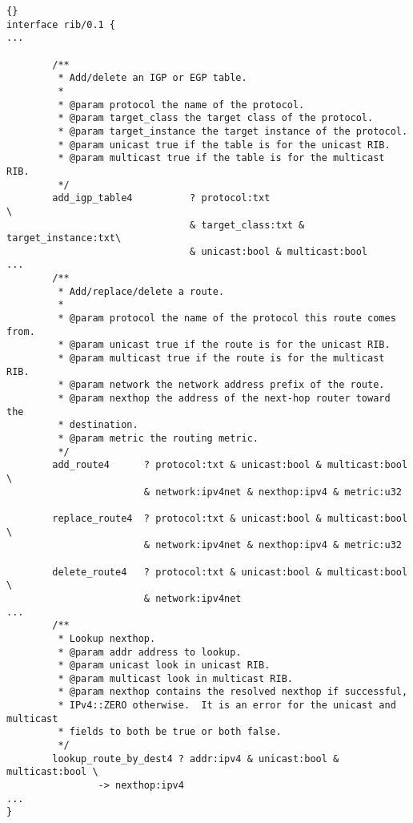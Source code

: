 \documentclass[11pt]{article}
\newcommand{\stt}{\tt\small}
\begin{document}
\newpage
\begin{lstlisting}[caption={Extracts from {\stt xorp/xrl/interfaces/rib.xif} %
                                     \label{lst:rib.xif} } ]{}
interface rib/0.1 {
...

        /**
         * Add/delete an IGP or EGP table.
         *
         * @param protocol the name of the protocol.
         * @param target_class the target class of the protocol.
         * @param target_instance the target instance of the protocol.
         * @param unicast true if the table is for the unicast RIB.
         * @param multicast true if the table is for the multicast RIB.
         */
        add_igp_table4          ? protocol:txt                          \
                                & target_class:txt & target_instance:txt\
                                & unicast:bool & multicast:bool
...
        /**
         * Add/replace/delete a route.
         *
         * @param protocol the name of the protocol this route comes from.
         * @param unicast true if the route is for the unicast RIB.
         * @param multicast true if the route is for the multicast RIB.
         * @param network the network address prefix of the route.
         * @param nexthop the address of the next-hop router toward the
         * destination.
         * @param metric the routing metric.
         */
        add_route4      ? protocol:txt & unicast:bool & multicast:bool  \
                        & network:ipv4net & nexthop:ipv4 & metric:u32

        replace_route4  ? protocol:txt & unicast:bool & multicast:bool  \
                        & network:ipv4net & nexthop:ipv4 & metric:u32

        delete_route4   ? protocol:txt & unicast:bool & multicast:bool  \
                        & network:ipv4net
...
        /**
         * Lookup nexthop.
         * @param addr address to lookup.
         * @param unicast look in unicast RIB.
         * @param multicast look in multicast RIB.
         * @param nexthop contains the resolved nexthop if successful,
         * IPv4::ZERO otherwise.  It is an error for the unicast and multicast
         * fields to both be true or both false.
         */
        lookup_route_by_dest4 ? addr:ipv4 & unicast:bool & multicast:bool \
                -> nexthop:ipv4
...
}
\end{lstlisting}
\newpage
\end{document}
